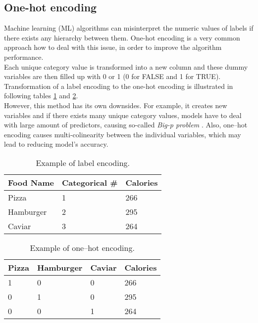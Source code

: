 \subsection{One-hot encoding}\label{OHE}
 Machine learning (ML) algorithms can misinterpret the numeric values of labels if there exists any hierarchy between them. One-hot encoding is a very common approach how to deal with this issue, in order to improve the algorithm performance. \\
 Each unique category value is transformed into a new column and these dummy variables are then filled up with 0 or 1 (0 for FALSE and 1 for TRUE). Transformation of a label encoding to the one-hot encoding is illustrated in following tables \ref{tab:LE} and \ref{tab:OHE}. \\
 However, this method has its own downsides. For example, it creates new variables and if there exists many unique category values, models have to deal with large amount of predictors, causing so-called \emph{Big-p problem} \cite{Bigp}. Also, one--hot encoding causes multi-colinearity between the individual variables, which may lead to reducing model's accuracy. 
 \begin{table}[h]
 	\centering
 	\begin{tabular}{|l|l|l|}
 		\hline
 		Food Name & Categorical \# & Calories \\ \hline
 		Pizza     & 1              & 266      \\ \hline
 		Hamburger & 2              & 295      \\ \hline
 		Caviar    & 3              & 264      \\ \hline
 	\end{tabular}
 	\caption{Example of label encoding.}
 	\label{tab:LE}
 \end{table}

\begin{table}[h]
	\centering
	\begin{tabular}{|l|l|l|l|}
		\hline
		Pizza & Hamburger & Caviar & Calories \\ \hline
		1     & 0         & 0      & 266      \\ \hline
		0     & 1         & 0      & 295      \\ \hline
		0     & 0         & 1      & 264      \\ \hline
	\end{tabular}
	\caption{Example of one--hot encoding.}
	\label{tab:OHE}
\end{table}